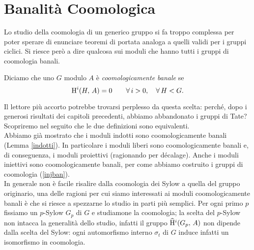 %
%


\section{Banalità Coomologica}
Lo studio della coomologia di un generico gruppo si fa troppo complessa per poter sperare di enunciare teoremi di portata analoga a quelli validi per i gruppi ciclici. Si riesce però a dire qualcosa sui moduli che hanno tutti i gruppi di coomologia banali.

\begin{definition}
	Diciamo che uno $ G $ modulo $ A $ è \emph{coomologicamente banale} se
	$$  \operatorname{H}^i(H, \, A) = 0 \qquad \forall \, i > 0, \quad  \forall \, H < G.  $$
\end{definition}

Il lettore più accorto potrebbe trovarsi perplesso da questa scelta: perché, dopo i generosi risultati dei capitoli precedenti, abbiamo abbandonato i gruppi di Tate? Scopriremo nel seguito che le due definizioni sono equivalenti. \\

Abbiamo già mostrato che i moduli indotti sono coomologicamente banali (Lemma \ref{indotti}). In particolare i moduli liberi sono coomologicamente banali e, di conseguenza, i moduli proiettivi (ragionando per décalage). Anche i moduli iniettivi sono coomologicamente banali, per come abbiamo costruito i gruppi di coomologia (\ref{injban}). \\

In generale non è facile risalire dalla coomologia dei Sylow a quella del gruppo originario, una delle ragioni per cui siamo interessati ai moduli coomologicamente banali è che si riesce a spezzarne lo studio in parti più semplici. Per ogni primo $ p $ fissiamo un $ p $-Sylow $ G_p $ di $ G $ e studiamone la coomologia; la scelta del $ p $-Sylow non intacca la generalità dello studio, infatti il gruppo $ \operatorname{\widehat{H}^\mathnormal{i}}(G_p, \, A) $ non dipende dalla scelta del Sylow: ogni automorfismo interno $ \sigma_t $ di $ G $ induce infatti un isomorfismo in coomologia. 

